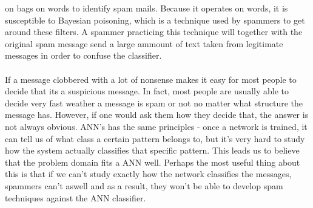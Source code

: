 on bags on words to identify spam mails. Because it operates on words, it is
susceptible to Bayesian poisoning, which is a technique used by spammers to get
around these filters. A spammer practicing this technique will together with
the original spam message send a large ammount of text taken from legitimate
messages in order to confuse the classifier.  \\\\ If a message clobbered with
a lot of nonsense makes it easy for most people to decide that its a suspicious
message. In fact, most people are usually able to decide very fast weather a
message is spam or not no matter what structure the message has. However, if
one would ask them how they decide that, the answer is not always obvious.
ANN's has the same principles - once a network is trained, it can tell us of
what class a certain pattern belongs to, but it's very hard to study how the
system actually classifies that specific pattern. This leads us to believe that
the problem domain fits a ANN well. Perhaps the most useful thing about this is
that if we can't study exactly how the network classifies the messages,
spammers can't aswell and as a result, they won't be able to develop spam
techniques against the ANN classifier.
